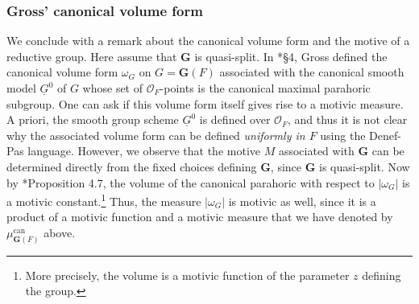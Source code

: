 \documentclass{amsart}
\newcommand{\ri}{\mathcal{O}}
\newcommand{\bG}{\mathbf{G}}
\newcommand{\can}{\mathrm{can}}
\theoremstyle{plain}
\theoremstyle{definition}
\begin{document}
\subsubsection{Gross' canonical volume form}
We conclude with a remark about the canonical volume form and the motive of a reductive group. 
Here assume that $\bG$ is quasi-split. In  \cite{gross:97a}*{\S 4}, Gross defined the canonical volume form
$\omega_G$ on $G=\bG(F)$ associated with the canonical smooth model 
$\underline{G}^0$ of $G$ whose set of $\ri_F$-points is the canonical maximal parahoric subgroup. 
One can ask if this volume form itself gives rise to a motivic measure. 
A priori, the smooth group scheme $\underline{G}^0$ is defined over $\ri_F$, and thus it is not clear why the
associated volume form can be defined \emph{uniformly in $F$} using the Denef-Pas language.
However, we observe that the motive $M$ associated with $\bG$ can be determined directly from the fixed choices defining $\bG$,
since $\bG$ is quasi-split.
Now by \cite{gross:97a}*{Proposition 4.7}, the volume of the canonical parahoric with respect to $|\omega_G|$
is a motivic constant.\footnote{More precisely, the volume is a motivic function of the parameter $z$ defining the group.}  
Thus, the measure $|\omega_G|$ is motivic as well, since it is a product of a motivic function
and a motivic measure that we have denoted by $\mu_{\bG(F)}^\can$ above. 




\end{document}
